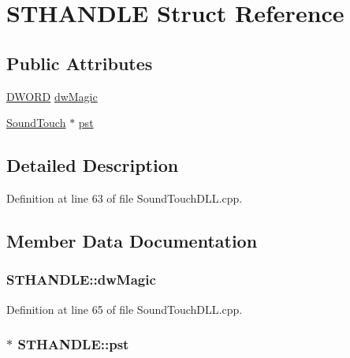 \hypertarget{struct_s_t_h_a_n_d_l_e}{}\section{S\+T\+H\+A\+N\+D\+LE Struct Reference}
\label{struct_s_t_h_a_n_d_l_e}
\subsection*{Public Attributes}
\begin{DoxyCompactItemize}
\item 
\hyperlink{mapinls_8h_ad342ac907eb044443153a22f964bf0af}{D\+W\+O\+RD} \hyperlink{struct_s_t_h_a_n_d_l_e_a9e348f62afdbd30f164ec95299e336f8}{dw\+Magic}
\item 
\hyperlink{classsoundtouch_1_1_sound_touch}{Sound\+Touch} $\ast$ \hyperlink{struct_s_t_h_a_n_d_l_e_a1a411139d86462cf9237604550866abc}{pst}
\end{DoxyCompactItemize}


\subsection{Detailed Description}


Definition at line 63 of file Sound\+Touch\+D\+L\+L.\+cpp.



\subsection{Member Data Documentation}
\subsubsection[{\texorpdfstring{dw\+Magic}{dwMagic}}]{ S\+T\+H\+A\+N\+D\+L\+E\+::dw\+Magic}\hypertarget{struct_s_t_h_a_n_d_l_e_a9e348f62afdbd30f164ec95299e336f8}{}\label{struct_s_t_h_a_n_d_l_e_a9e348f62afdbd30f164ec95299e336f8}


Definition at line 65 of file Sound\+Touch\+D\+L\+L.\+cpp.

\subsubsection[{\texorpdfstring{pst}{pst}}]{$\ast$ S\+T\+H\+A\+N\+D\+L\+E\+::pst}\hypertarget{struct_s_t_h_a_n_d_l_e_a1a411139d86462cf9237604550866abc}{}\label{struct_s_t_h_a_n_d_l_e_a1a411139d86462cf9237604550866abc}


